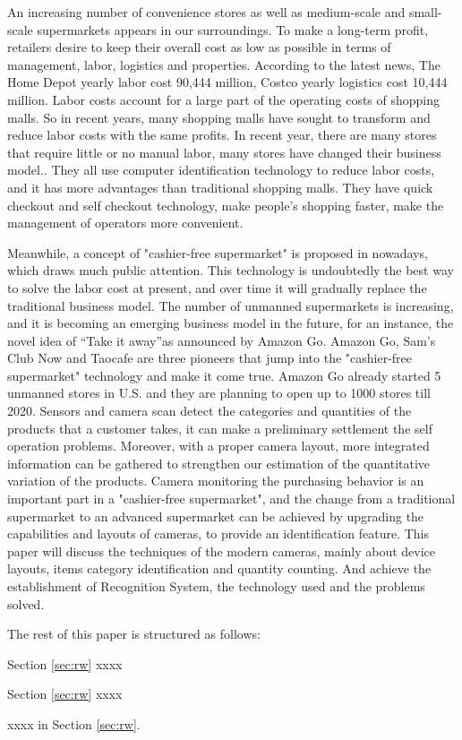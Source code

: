 An increasing number of convenience stores as well as medium-scale and small-scale supermarkets appears in our surroundings.
To make a long-term profit, retailers desire to keep their overall cost as low as possible in terms of management, labor, logistics and properties.
According to the latest news, The Home Depot yearly labor cost 90,444 million, Costco yearly logistics cost 10,444 million.
Labor costs account for a large part of the operating costs of shopping malls.
So in recent years, many shopping malls have sought to transform and reduce labor costs with the same profits.
In recent year, there are many stores that require little or no manual labor, many stores have changed their business model..
They all use computer identification technology to reduce labor costs, and it has more advantages than traditional shopping malls.
They have quick checkout and self checkout technology, make people's shopping faster, make the management of operators more convenient.

Meanwhile, a concept of "cashier-free supermarket" is proposed in nowadays, which draws much public attention.
This technology is undoubtedly the best way to solve the labor cost at present, and over time it will gradually replace the traditional business model.
The number of unmanned supermarkets is increasing, and it is becoming an emerging business model in the future, for an instance,  the novel idea of “Take it away”as announced by Amazon Go.
Amazon Go, Sam's Club Now and Taocafe are three pioneers that jump into the "cashier-free supermarket" technology and make it come true.
Amazon Go already started 5 unmanned stores in U.S. and they are planning to open up to 1000 stores till 2020.
Sensors and camera scan detect the categories and quantities of the products that a customer takes, it can make a preliminary settlement the self operation problems.
Moreover, with a proper camera layout, more integrated information can be gathered to strengthen our estimation of the quantitative variation of the products\cite{ERDEM2006156}.
Camera monitoring the purchasing behavior is an important part in a "cashier-free supermarket", and the change from a traditional supermarket to an advanced supermarket can be achieved by upgrading the capabilities and layouts of cameras, to provide an identification feature.
This paper will discuss the techniques of the modern cameras, mainly about device layouts, items category identification and quantity counting.
And achieve the establishment of Recognition System, the technology used and the problems solved.

The rest of this paper is structured as follows:

Section \ref{sec:rw} xxxx

Section \ref{sec:rw} xxxx

 xxxx in Section \ref{sec:rw}.

